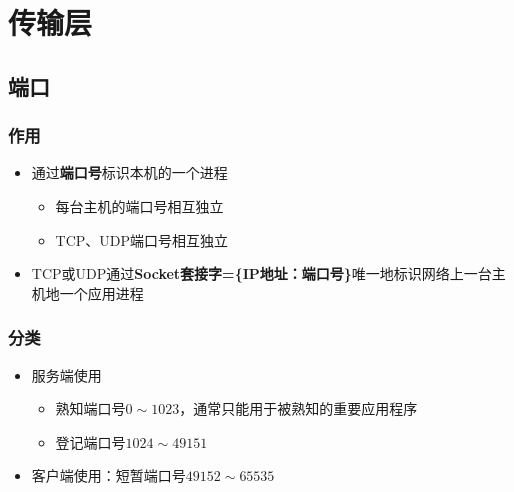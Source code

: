 
\chapter{传输层}

\section{端口}

\subsection{作用}

\begin{itemize}
    \item 通过\textbf{端口号}标识本机的一个进程\begin{itemize}
        \item 每台主机的端口号相互独立
        \item TCP、UDP端口号相互独立
    \end{itemize}
    \item TCP或UDP通过\textbf{Socket套接字=\{IP地址：端口号\}}唯一地标识网络上一台主机地一个应用进程
\end{itemize}


\subsection{分类}
\begin{itemize}
    \item 服务端使用\begin{itemize}
        \item 熟知端口号\(0\sim 1023\)，通常只能用于被熟知的重要应用程序
        \item 登记端口号\(1024 \sim 49151\)
    \end{itemize}
    \item 客户端使用：短暂端口号\(49152 \sim 65535\)
\end{itemize}


